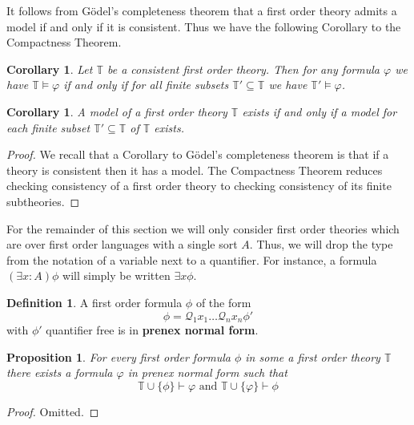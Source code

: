 \documentclass[12pt]{article}
\theoremstyle{plain}
\newtheorem{proposition}[thm]{Proposition}
\newtheorem{cor}[thm]{Corollary}
\theoremstyle{definition}
\newtheorem{defn}[thm]{Definition} %
\newcommand{\bb}[1]{\mathbb{#1}}
\newcommand{\scr}[1]{\mathscr{#1}}
\begin{document}
	It follows from G\"{o}del's completeness theorem that a first order theory admits a model if and only if it is consistent. Thus we have the following Corollary to the Compactness Theorem.
	
	\begin{cor}
		Let $\bb{T}$ be a consistent first order theory. Then for any formula $\varphi$ we have $\bb{T} \models \varphi$ if and only if for all finite subsets $\bb{T}' \subseteq \bb{T}$ we have $\bb{T}' \models \varphi$.
		\end{cor}
	
	\begin{cor}
		A model of a first order theory $\bb{T}$ exists if and only if a model for each finite subset $\bb{T}' \subseteq \bb{T}$ of $\bb{T}$ exists.
		\end{cor}
	\begin{proof}
		We recall that a Corollary to G\"{o}del's completeness theorem is that if a theory is consistent then it has a model. The Compactness Theorem reduces checking consistency of a first order theory to checking consistency of its finite subtheories.
		\end{proof}
	
	For the remainder of this section we will only consider first order theories which are over first order languages with a single sort $A$. Thus, we will drop the type from the notation of a variable next to a quantifier. For instance, a formula $(\exists x : A)\phi$ will simply be written $\exists x \phi$.
	
	\begin{defn}
		A first order formula $\phi$ of the form
		\begin{equation}
			\phi = \scr{Q}_1x_1 \ldots \scr{Q}_nx_n \phi'
			\end{equation}
		with $\phi'$ quantifier free is in \textbf{prenex normal form}.
		\end{defn}
	
	\begin{proposition}
		For every first order formula $\phi$ in some a first order theory $\bb{T}$ there exists a formula $\varphi$ in prenex normal form such that
		\begin{equation}
			\bb{T} \cup \{ \phi \}\vdash \varphi\text{ and }\bb{T} \cup \{ \varphi \} \vdash \phi
			\end{equation}
		\end{proposition}
	\begin{proof}
		Omitted.
		\end{proof}
	
\end{document}
